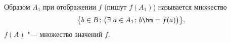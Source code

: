 
    Образом $A_1$ при отображении $f$ (пишут $f(A_1)$) называется множество 
    \[\bigl\{b\in B\colon \bigl(\exists\  a\in A_1\colon b\hm=f(a)\bigr)\bigr\}.\]
    $f(A)$ "--- множество значений $f$.

